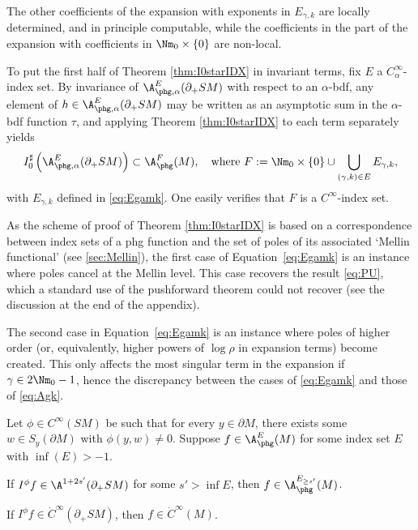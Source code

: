The other coefficients of the expansion with exponents in $E_{\gamma,k}$ are locally determined, and in principle computable, while the coefficients in the part of the expansion with coefficients in $\Nm_0\times\{0\}$ are non-local.

\begin{Remark}
To put the first half of Theorem \ref{thm:I0starIDX} in invariant terms, fix $E$ a $C_{\alpha}^\infty$-index set. By invariance of $\A_{\phg,\alpha}^E (\partial_+ SM)$ with respect to an $\alpha$-bdf, any element of $h\in \A_{\phg,\alpha}^E (\partial_+ SM)$ may be written as an asymptotic sum in the $\alpha$-bdf function $\tau$, and applying Theorem \ref{thm:I0starIDX} to each term separately yields
\begin{equation*}
I_0^\sharp \left(\A_{\phg,\alpha}^E (\partial_+ SM) \right) \subset \A_{\phg}^F (M), \quad \text{where } F:= \Nm_0 \times \{0\} \cup \bigcup_{(\gamma,k)\in E} E_{\gamma,k},
\end{equation*}
with $E_{\gamma,k}$ defined in \eqref{eq:Egamk}. One easily verifies that $F$ is a $C^\infty$-index set.
\end{Remark}

\begin{Remark}
As the scheme of proof of Theorem \ref{thm:I0starIDX} is based on a correspondence between index sets of a phg function and the set of poles of its associated `Mellin functional' (see \ref{sec:Mellin}), the first case of Equation~\eqref{eq:Egamk} is an instance where poles cancel at the Mellin level. This case recovers the result \eqref{eq:PU}, which a standard use of the pushforward theorem could not recover (see the discussion at the end of the appendix).

The second case in Equation~\eqref{eq:Egamk} is an instance where poles of higher order (or, equivalently, higher powers of $\log \rho$ in expansion terms) become created. This only affects the most singular term in the expansion if $\gamma\in 2\Nm_0-1$, hence the discrepancy between the cases of \eqref{eq:Egamk} and those of \eqref{eq:Agk}.
\end{Remark}

 \label{sec:consequences}


\begin{Theorem}\label{thm:bdrydet}
Let $\phi\in C^\infty(SM)$ be such that for every $y\in \partial M$, there exists some $w\in S_y(\partial M)$ with $\phi(y,w)\ne 0$.
Suppose $f\in \A^E_{\phg}(M)$ for some index set $E$ with $\inf (E)>-1$.
\begin{enumeratei}
\item\label{thm:bdrydeti}
If $I^\phi f \in \A^{1+2s'} (\partial_+ SM)$ for some $s'>\inf E$, then $f\in \A^{E_{\geq s'}}_{\phg}(M)$.

\item\label{thm:bdrydetii}
If $I^\phi f \in \dot{C}^\infty (\partial_+ SM)$, then $f\in \dot{C}^\infty(M)$.
\end{enumeratei}
\end{Theorem}

